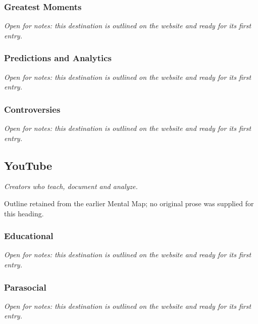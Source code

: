 \documentclass{article}
\begin{document}
\subsubsection{Greatest Moments}\label{sec:greatest-moments}
\textit{Open for notes: this destination is outlined on the website and ready for its first entry.}

\subsubsection{Predictions and Analytics}\label{sec:predictions-and-analytics}
\textit{Open for notes: this destination is outlined on the website and ready for its first entry.}

\subsubsection{Controversies}\label{sec:big-brother-and-survivor-controversies}
\textit{Open for notes: this destination is outlined on the website and ready for its first entry.}

\subsection{YouTube}\label{sec:youtube}
\textit{Creators who teach, document and analyze.}

Outline retained from the earlier Mental Map; no original prose was supplied for this heading.

\subsubsection{Educational}\label{sec:educational}
\textit{Open for notes: this destination is outlined on the website and ready for its first entry.}

\subsubsection{Parasocial}\label{sec:parasocial}
\textit{Open for notes: this destination is outlined on the website and ready for its first entry.}
\end{document}
